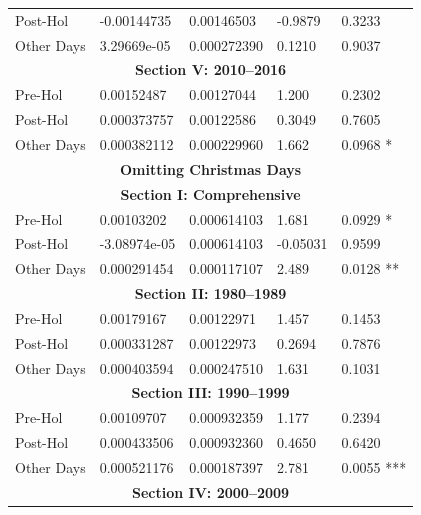 \documentclass[11pt, english]{article}
\begin{document}
\begin{center}
\begin{longtable}{p{2cm}p{2cm}p{2cm}p{2cm}p{2cm}}
                Post-Hol & -0.00144735 & 0.00146503 & -0.9879 & 0.3233\\  
                Other Days & 3.29669e-05 & 0.000272390 & 0.1210 & 0.9037\\
                \hline 
                \multicolumn{5}{c}{\textbf{Section V: 2010--2016}}\\   
                \hline            
                Pre-Hol & 0.00152487 & 0.00127044 & 1.200 & 0.2302\\ 
                Post-Hol & 0.000373757 & 0.00122586 & 0.3049 & 0.7605\\  
                Other Days & 0.000382112 & 0.000229960 & 1.662 & 0.0968 *\\
                \hline 
                \hline                                          
                \multicolumn{5}{c}{\textbf{Omitting Christmas Days}}\\
		\hline
                \hline
                \multicolumn{5}{c}{\textbf{Section I: Comprehensive}}\\
                \hline
                Pre-Hol & 0.00103202 & 0.000614103 & 1.681 & 0.0929 *\\
                Post-Hol & -3.08974e-05 & 0.000614103 & -0.05031 & 0.9599\\
                Other Days & 0.000291454 & 0.000117107 & 2.489 & 0.0128 **\\
                \hline
                \multicolumn{5}{c}{\textbf{Section II: 1980--1989}}\\
                \hline
                Pre-Hol & 0.00179167 & 0.00122971 & 1.457 & 0.1453\\
                Post-Hol & 0.000331287 & 0.00122973 & 0.2694 & 0.7876\\  
                Other Days & 0.000403594 & 0.000247510 & 1.631 & 0.1031\\
                \hline 
                \multicolumn{5}{c}{\textbf{Section III: 1990--1999}}\\   
                \hline            
                Pre-Hol & 0.00109707 & 0.000932359 & 1.177 & 0.2394\\ 
                Post-Hol & 0.000433506 & 0.000932360 & 0.4650 & 0.6420\\
                Other Days & 0.000521176 & 0.000187397 & 2.781 & 0.0055 ***\\
                \hline 
                \multicolumn{5}{c}{\textbf{Section IV: 2000--2009}}\\
                \hline                                          

\end{longtable}
\end{center}
\end{document}
